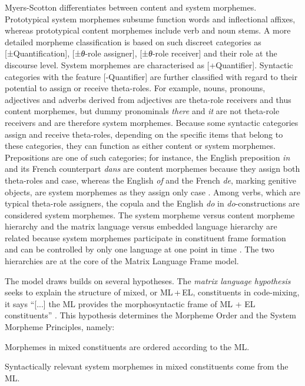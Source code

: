 Myers-Scotton differentiates between content and system morphemes. Prototypical system morphemes subsume function words and inflectional affixes, whereas prototypical content morphemes include verb and noun stems. A more detailed morpheme classification is based on such discreet categories as [±Quantification], [±\textit{θ}-role assigner], [±\textit{θ}-role receiver] and their role at the discourse level. System morphemes are characterised as [+Quantifier]. Syntactic categories with the feature [-Quantifier] are further classified with regard to their potential to assign or receive theta-roles. For example, nouns, pronouns, adjectives and adverbs derived from adjectives are theta-role receivers and thus content morphemes, but dummy pronominals \textit{there} and \textit{it} are not theta-role receivers and are therefore system morphemes. Because some syntactic categories assign and receive theta-roles, depending on the specific items that belong to these categories, they can function as either content or system morphemes. Prepositions are one of such categories; for instance, the English preposition \textit{in} and its French counterpart \textit{dans} are content morphemes because they assign both theta-roles and case, whereas the English \textit{of} and the French \textit{de}, marking genitive objects, are system morphemes as they assign only case \citep[cf.][98--102]{myers-scotton-duelling-1993}. Among verbs, which are typical theta-role assigners, the copula and the English \textit{do} in \textit{do}-constructions are considered system morphemes. The system morpheme versus content morpheme hierarchy and the matrix language versus embedded language hierarchy are related because system morphemes participate in constituent frame formation and can be controlled by only one language at one point in time \citep[235]{milroy-lexically-1995}. The two hierarchies are at the core of the Matrix Language Frame model.


The model draws builds on several hypotheses. The \textit{matrix language hypothesis} seeks to explain the structure of mixed, or ML\,+\,EL,  constituents in code-mixing, it says ``[...] the ML provides the morphosyntactic frame of ML + EL constituents'' \citep[82]{myers-scotton-duelling-1993}. This hypothesis determines the Morpheme Order and the System Morpheme Principles, namely:

\begin{description}\sloppy
\item [The Morpheme Order Principle:] Morphemes in mixed constituents are ordered according to the ML. 
\item [The System Morpheme Principle:] Syntactically relevant system morphemes in mixed constituents come from the ML. \citep[cf.][239]{milroy-lexically-1995} 
\end{description}

